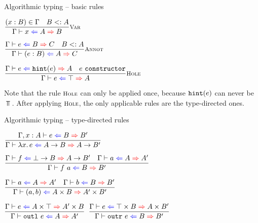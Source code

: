 \documentclass{beamer}
\begin{document}
\begin{frame}{Algorithmic typing -- basic rules}

\begin{center}
  $\infrule[Var]{\sidecond{(x : B) \in \Gamma} \quad \sidecond{\subtyping{B}{A}}}{\hinting{x}{A}{B}}$

  \vspace{2em}

  $\infrule[Annot]{\hinting{e}{B}{C} \quad \sidecond{\subtyping{B}{A}}}{\hinting{\annot{e}{B}}{A}{C}}$

  \vspace{2em}

  $\infrule[Hole]{\hinting{e}{\hintfor{e}}{A} \quad \sidecond{e\ \texttt{constructor}}}{\hinting{e}{\Top}{A}}$
\end{center}

\vspace{2em}

Note that the rule $\textsc{\footnotesize{Hole}}$ can only be applied once, because $\texttt{hint}(e)$ can never be $\Top$. After applying $\textsc{\footnotesize{Hole}}$, the only applicable rules are the type-directed ones.

\end{frame}

\begin{frame}{Algorithmic typing -- type-directed rules}

\begin{center}
  $\infrule{\fullhinting{\extend{\Gamma}{x}{A}}{e}{B}{B'}}{\hinting{\fun{x}{e}}{\Fun{A}{B}}{\Fun{A}{B'}}}$

  \vspace{1em}

  $\infrule{\hinting{f}{\Fun{\Bot}{B}}{\Fun{A}{B'}} \quad \hinting{a}{A}{A'}}{\hinting{\app{f}{a}}{B}{B'}}$

  \vspace{1em}

  $\infrule{\hinting{a}{A}{A'} \quad \hinting{b}{B}{B'}}{\hinting{\pair{a}{b}}{\Prod{A}{B}}{\Prod{A'}{B'}}}$

  \vspace{1em}

  $\infrule{\hinting{e}{\Prod{A}{\Top}}{\Prod{A'}{B}}}{\hinting{\outl{e}}{A}{A'}}$ \quad
  $\infrule{\hinting{e}{\Prod{\Top}{B}}{\Prod{A}{B'}}}{\hinting{\outr{e}}{B}{B'}}$
\end{center}

\end{frame}
\end{document}
